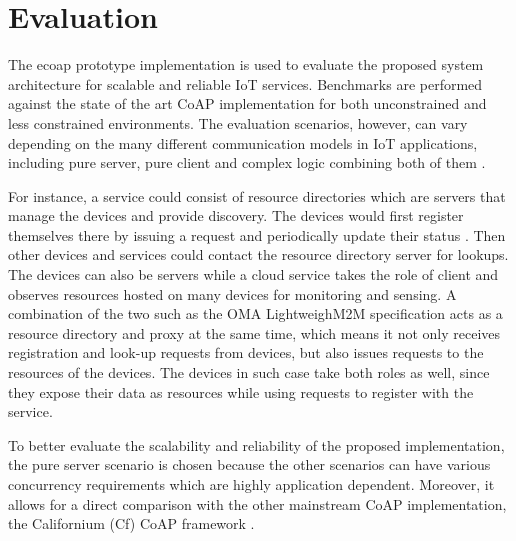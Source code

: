 \chapter{Evaluation}\label{ch5}

The ecoap prototype implementation is used to evaluate the proposed system architecture for scalable and reliable IoT services. Benchmarks are performed against the state of the art CoAP implementation for both unconstrained and less constrained environments. The evaluation scenarios, however, can vary depending on the many different communication models in IoT applications, including pure server, pure client and complex logic combining both of them \cite{kovatsch2015scalable}. 

For instance, a service could consist of resource directories which are servers that manage the devices and provide discovery. The devices would first register themselves there by issuing a request and periodically update their status \cite{core_directory}. Then other devices and services could contact the resource directory server for lookups. The devices can also be servers while a cloud service takes the role of client and observes resources hosted on many devices for monitoring and sensing. A combination of the two such as the OMA LightweighM2M \cite{lwm2m} specification acts as a resource directory and proxy at the same time, which means it not only receives registration and look-up requests from devices, but also issues requests to the resources of the devices. The devices in such case take both roles as well, since they expose their data as resources while using requests to register with the service.

To better evaluate the scalability and reliability of the proposed implementation, the pure server scenario is chosen because the other scenarios can have various concurrency requirements which are highly application dependent. Moreover, it allows for a direct comparison with the other mainstream CoAP implementation, the Californium (Cf) CoAP framework \cite{californium}.

